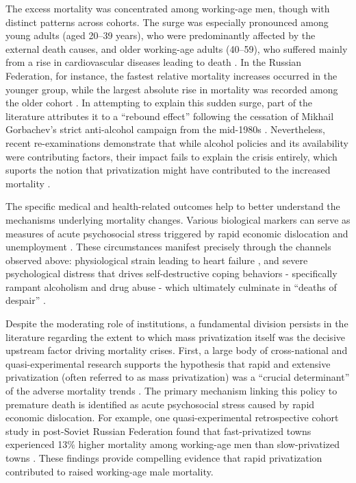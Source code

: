 \documentclass[en,magisterska]{pracamgr}
\begin{document}
The excess mortality was concentrated among working-age men, though with distinct patterns across cohorts. 
The surge was especially pronounced among young adults (aged 20–39 years), who were predominantly affected by the external death causes, and older 
working-age adults (40–59), who suffered mainly from a rise in cardiovascular diseases leading to death \citep{Cornia2016}. In the Russian Federation, 
for instance, the fastest relative mortality increases occurred in the younger group, while the largest absolute rise in mortality was recorded 
among the older cohort \citep{Eberstadt1999}. In attempting to explain this sudden surge, part of the literature attributes it to a ``rebound effect''
following the cessation of Mikhail Gorbachev's strict anti-alcohol campaign from the mid-1980s \citep{Bhattacharya2013, Treisman2010, Leon1997}. Nevertheless, recent re-examinations 
demonstrate that while alcohol policies and its availability were contributing factors, their impact fails to explain the crisis entirely, which suports the notion that   
privatization might have contributed to the increased mortality \citep{Azarova2019}.

The specific medical and health-related outcomes help to better understand the mechanisms underlying mortality changes. Various biological markers can serve as measures of acute psychosocial 
stress triggered by rapid economic dislocation and unemployment \citep{Stuckler2009}. These circumstances manifest precisely through the channels observed above: physiological 
strain leading to heart failure \citep{B_Brainerd1998, Leon1998}, and severe psychological distress that drives self-destructive coping behaviors  -  specifically rampant 
alcoholism and drug abuse \citep{Zaridze2009}  -  which ultimately culminate in ``deaths of despair'' \citep{King2009}.

Despite the moderating role of institutions, a fundamental division persists in the literature regarding the extent to which mass 
privatization itself was the decisive upstream factor driving mortality crises.
First, a large body of cross-national and quasi-experimental research supports the hypothesis that rapid and extensive privatization (often referred to as mass privatization) was a 
``crucial determinant'' of the adverse mortality trends \citep{Stuckler2009, Azarova2018, Azarova2019, King2009}. The primary mechanism linking this policy to premature death is identified 
as acute psychosocial stress caused by rapid economic dislocation. For example, one quasi-experimental retrospective cohort study in post-Soviet Russian Federation found that fast-privatized 
towns experienced 13\% higher mortality among working-age men than slow-privatized towns \citep{Azarova2018}. These findings provide compelling evidence that rapid privatization contributed 
to raised working-age male mortality. 
\end{document}
